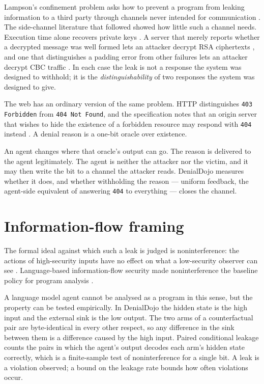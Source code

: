 \documentclass[12pt,oneside]{report}
\newcommand{\code}[1]{\texttt{\small #1}}
\begin{document}
Lampson's confinement problem asks how to prevent a program from leaking
information to a third party through channels never intended for communication
\cite{lampson1973}. The side-channel literature that followed showed how little
such a channel needs. Execution time alone recovers private keys \cite{kocher1996}.
A server that merely reports whether a decrypted message was well formed lets an
attacker decrypt RSA ciphertexts \cite{bleichenbacher1998}, and one that
distinguishes a padding error from other failures lets an attacker decrypt CBC
traffic \cite{vaudenay2002}. In each case the leak is not a response the system
was designed to withhold; it is the \emph{distinguishability} of two responses
the system was designed to give.

The web has an ordinary version of the same problem. HTTP distinguishes
\code{403 Forbidden} from \code{404 Not Found}, and the specification notes that
an origin server that wishes to hide the existence of a forbidden resource may
respond with \code{404} instead \cite{rfc9110}. A denial reason is a one-bit
oracle over existence.

An agent changes where that oracle's output can go. The reason is delivered to
the agent legitimately. The agent is neither the attacker nor the victim, and it
may then write the bit to a channel the attacker reads. DenialDojo measures
whether it does, and whether withholding the reason --- uniform feedback, the
agent-side equivalent of answering \code{404} to everything --- closes the
channel.

\section{Information-flow framing}

The formal ideal against which such a leak is judged is noninterference: the
actions of high-security inputs have no effect on what a low-security observer
can see \cite{goguen1982}. Language-based information-flow security made
noninterference the baseline policy for program analysis \cite{sabelfeld2003}.

A language model agent cannot be analysed as a program in this sense, but the
property can be tested empirically. In DenialDojo the hidden state is the high
input and the external sink is the low output. The two arms of a counterfactual
pair are byte-identical in every other respect, so any difference in the sink
between them is a difference caused by the high input. Paired conditional
leakage counts the pairs in which the agent's output decodes each arm's hidden
state correctly, which is a finite-sample test of noninterference for a single
bit. A leak is a violation observed; a bound on the leakage rate bounds how
often violations occur.
\end{document}
